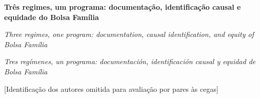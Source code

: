 \documentclass[12pt,a4paper,oneside]{article}
\begin{document}
\begin{center}{\LARGE\bfseries Três regimes, um programa: documentação, identificação causal e equidade do Bolsa Família\par}\end{center}

\begin{center}{\large\itshape Three regimes, one program: documentation, causal identification, and equity of Bolsa Família\par}\end{center}

\begin{center}{\large\itshape Tres regímenes, un programa: documentación, identificación causal y equidad de Bolsa Família\par}\end{center}

\begin{center}{\footnotesize [Identificação dos autores omitida para avaliação por pares às cegas]\par}\end{center}

\vspace{6pt}


\end{document}
